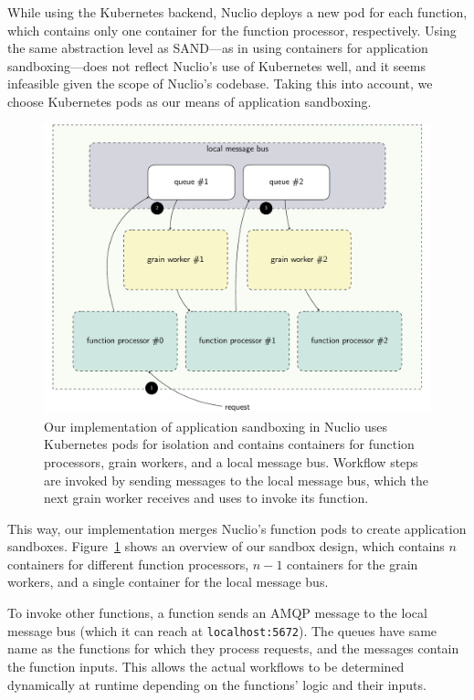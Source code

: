 While using the Kubernetes backend, Nuclio deploys a new pod for each function, which contains only one container for the function processor, respectively.
Using the same abstraction level as SAND—as in using containers for application sandboxing—does not reflect Nuclio's use of Kubernetes well, and it seems infeasible given the scope of Nuclio's codebase. 
Taking this into account, we choose Kubernetes pods as our means of application sandboxing.

\begin{figure}[!h]
    \centering
    \includegraphics[width=\linewidth]{figures/sandbox.pdf}
    \caption{
        Our implementation of application sandboxing in Nuclio uses Kubernetes pods for isolation and contains containers for function processors, grain workers, and a local message bus. 
        Workflow steps are invoked by sending messages to the local message bus, which the next grain worker receives and uses to invoke its function.
    }\label{fig:sandbox}
\end{figure}

This way, our implementation merges Nuclio's function pods to create application sandboxes. Figure~\ref{fig:sandbox} shows an overview of our sandbox design, which contains $n$ containers for different function processors, $n-1$ containers for the grain workers, and a single container for the local message bus.

To invoke other functions, a function sends an AMQP message to the local message bus (which it can reach at \texttt{localhost:5672}). 
The queues have same name as the functions for which they process requests, and the messages contain the function inputs. 
This allows the actual workflows to be determined dynamically at runtime depending on the functions' logic and their inputs.

